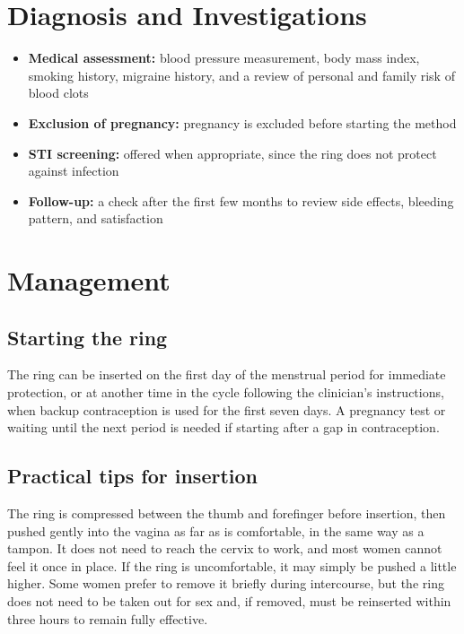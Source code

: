 \section*{Diagnosis and Investigations}
\begin{itemize}
    \item \textbf{Medical assessment:} blood pressure measurement, body mass index, smoking history, migraine history, and a review of personal and family risk of blood clots
    \item \textbf{Exclusion of pregnancy:} pregnancy is excluded before starting the method
    \item \textbf{STI screening:} offered when appropriate, since the ring does not protect against infection
    \item \textbf{Follow-up:} a check after the first few months to review side effects, bleeding pattern, and satisfaction
\end{itemize}

\section*{Management}
\subsection*{Starting the ring}
The ring can be inserted on the first day of the menstrual period for immediate protection, or at another time in the cycle following the clinician's instructions, when backup contraception is used for the first seven days. A pregnancy test or waiting until the next period is needed if starting after a gap in contraception.

\subsection*{Practical tips for insertion}
The ring is compressed between the thumb and forefinger before insertion, then pushed gently into the vagina as far as is comfortable, in the same way as a tampon. It does not need to reach the cervix to work, and most women cannot feel it once in place. If the ring is uncomfortable, it may simply be pushed a little higher. Some women prefer to remove it briefly during intercourse, but the ring does not need to be taken out for sex and, if removed, must be reinserted within three hours to remain fully effective.

